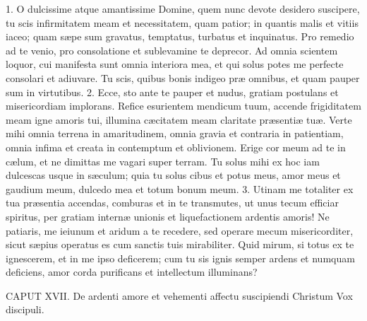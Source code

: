 1. O dulcissime atque amantissime Domine, quem nunc devote desidero suscipere, tu scis infirmitatem meam et necessitatem, quam patior; in quantis malis et vitiis iaceo; quam sæpe sum gravatus, temptatus, turbatus et inquinatus. Pro remedio ad te venio, pro consolatione et sublevamine te deprecor. Ad omnia scientem loquor, cui manifesta sunt omnia interiora mea, et qui solus potes me perfecte consolari et adiuvare. Tu scis, quibus bonis indigeo præ omnibus, et quam pauper sum in virtutibus.
2. Ecce, sto ante te pauper et nudus, gratiam postulans et misericordiam implorans. Refice esurientem mendicum tuum, accende frigiditatem meam igne amoris tui, illumina cæcitatem meam claritate præsentiæ tuæ. Verte mihi omnia terrena in amaritudinem, omnia gravia et contraria in patientiam, omnia infima et creata in contemptum et oblivionem. Erige cor meum ad te in cælum, et ne dimittas me vagari super terram. Tu solus mihi ex hoc iam dulcescas usque in sæculum; quia tu solus cibus et potus meus, amor meus et gaudium meum, dulcedo mea et totum bonum meum.
3. Utinam me totaliter ex tua præsentia accendas, comburas et in te transmutes, ut unus tecum efficiar spiritus, per gratiam internæ unionis et liquefactionem ardentis amoris! Ne patiaris, me ieiunum et aridum a te recedere, sed operare mecum misericorditer, sicut sæpius operatus es cum sanctis tuis mirabiliter. Quid mirum, si totus ex te ignescerem, et in me ipso deficerem; cum tu sis ignis semper ardens et numquam deficiens, amor corda purificans et intellectum illuminans?


CAPUT XVII.
De ardenti amore et vehementi affectu suscipiendi Christum
Vox discipuli.


